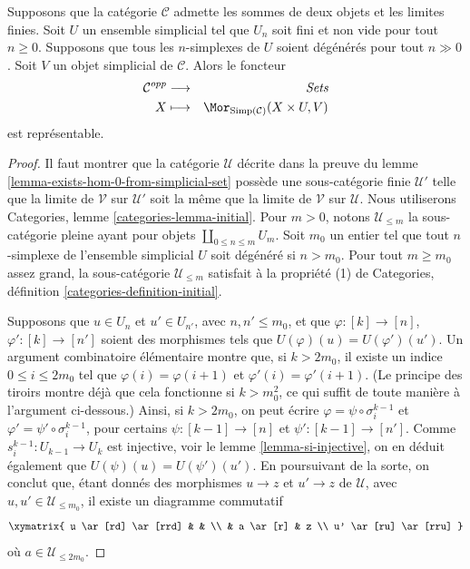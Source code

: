 \begin{lemma}
\label{lemma-exists-hom-0-from-simplicial-set-finite}
Supposons que la catégorie $\mathcal{C}$ admette les sommes de deux objets
et les limites finies. Soit $U$ un ensemble simplicial tel que $U_n$ soit
fini et non vide pour tout $n \geq 0$. Supposons que tous les
$n$-simplexes de $U$ soient dégénérés pour tout $n \gg 0$.
Soit $V$ un objet simplicial de $\mathcal{C}$. Alors le foncteur
\begin{eqnarray*}
\mathcal{C}^{opp} & \longrightarrow & \textit{Sets} \\
X
& \longmapsto &
\Mor_{\text{Simp}(\mathcal{C})}(X \times U, V)
\end{eqnarray*}
est représentable.
\end{lemma}

\begin{proof}
Il faut montrer que la catégorie $\mathcal{U}$ décrite dans la preuve du
lemme \ref{lemma-exists-hom-0-from-simplicial-set} possède une
sous-catégorie finie $\mathcal{U}'$ telle que la limite de $\mathcal{V}$
sur $\mathcal{U}'$ soit la même que la limite de $\mathcal{V}$ sur
$\mathcal{U}$.
Nous utiliserons Categories, lemme \ref{categories-lemma-initial}.
Pour $m > 0$, notons $\mathcal{U}_{\leq m}$ la sous-catégorie pleine ayant
pour objets $\coprod_{0 \leq n \leq m} U_m$. Soit $m_0$ un entier tel que
tout $n$-simplexe de l'ensemble simplicial $U$ soit dégénéré si $n > m_0$.
Pour tout $m \geq m_0$ assez grand, la sous-catégorie
$\mathcal{U}_{\leq m}$ satisfait à la propriété (1) de Categories,
définition \ref{categories-definition-initial}.

\medskip\noindent
Supposons que $u \in U_n$ et
$u' \in U_{n'}$, avec $n, n' \leq m_0$, et que
$\varphi : [k] \to [n]$, $\varphi' : [k] \to [n']$
soient des morphismes tels que $U(\varphi)(u) = U(\varphi')(u')$.
Un argument combinatoire élémentaire montre que, si $k > 2m_0$,
il existe un indice $0 \leq i \leq 2m_0$ tel que
$\varphi(i) =\varphi(i + 1)$ et $\varphi'(i) = \varphi'(i + 1)$.
(Le principe des tiroirs montre déjà que cela fonctionne si
$k > m_0^2$, ce qui suffit de toute manière à l'argument ci-dessous.)
Ainsi, si $k > 2m_0$, on peut écrire
$\varphi = \psi \circ \sigma^{k - 1}_i$ et
$\varphi' = \psi' \circ \sigma^{k - 1}_i$, pour certains
$\psi : [k - 1] \to [n]$ et $\psi' : [k - 1] \to [n']$.
Comme $s^{k - 1}_i : U_{k - 1} \to U_k$ est injective,
voir le lemme \ref{lemma-si-injective}, on en déduit également que
$U(\psi)(u) = U(\psi')(u')$. En poursuivant de la sorte,
on conclut que, étant donnés des morphismes
$u \to z$ et $u' \to z$ de $\mathcal{U}$,
avec $u, u' \in \mathcal{U}_{\leq m_0}$, il existe
un diagramme commutatif
$$
\xymatrix{
u \ar[rd] \ar[rrd] & & \\
& a \ar[r] & z \\
u' \ar[ru] \ar[rru]
}
$$
où $a \in \mathcal{U}_{\leq 2m_0}$.


\end{proof}
